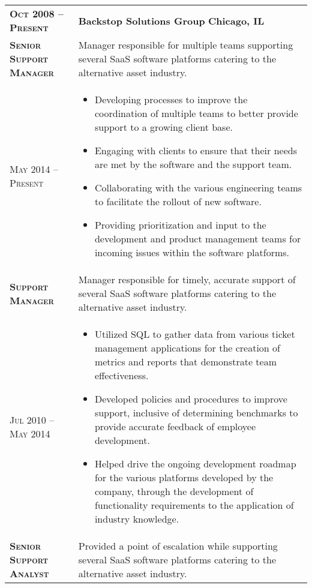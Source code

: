 \documentclass[a4paper, oneside, final]{scrartcl} %
\newcommand{\gray}{\rowcolor[gray]{.90}} %
\begin{document}
\begin{center}
\begin{tabularx}{0.97\linewidth}{>{\raggedright\scshape}p{3.4cm}X}
\gray \textbf{Oct 2008 -- Present} & \textbf{Backstop Solutions Group} \hfill \textbf{Chicago, IL}\\ 
\textbf{Senior Support Manager} & Manager responsible for multiple teams supporting several SaaS software platforms catering to the alternative asset industry.\\
May 2014 -- Present & \vspace{-6mm}
\begin{itemize}
\setlength{\itemsep}{0cm}%
\setlength{\parskip}{0cm}%
\item Developing processes to improve the coordination of multiple teams to better provide support to a growing client base.
\item Engaging with clients to ensure that their needs are met by the software and the support team. 
\item Collaborating with the various engineering teams to facilitate the rollout of new software.
\item Providing prioritization and input to the development and product management teams for incoming issues within the software platforms.  
\end{itemize}\\
\textbf{Support Manager} & Manager responsible for timely, accurate support of several SaaS software platforms catering to the alternative asset industry.\\
Jul 2010 -- May 2014 & \vspace{-6mm}
\begin{itemize}
\setlength{\itemsep}{0cm}%
\setlength{\parskip}{0cm}%
\item Utilized SQL to gather data from various ticket management applications for the creation of metrics and reports that demonstrate team effectiveness.
\item Developed policies and procedures to improve support, inclusive of determining benchmarks to provide accurate feedback of employee development.
\item Helped drive the ongoing development roadmap for the various platforms developed by the company, through the development of functionality requirements to the application of industry knowledge.
\end{itemize}\\
\textbf{Senior Support Analyst} & Provided a point of escalation while supporting several SaaS software platforms catering to the alternative asset industry.\\

\end{tabularx}
\end{center}
\end{document}
